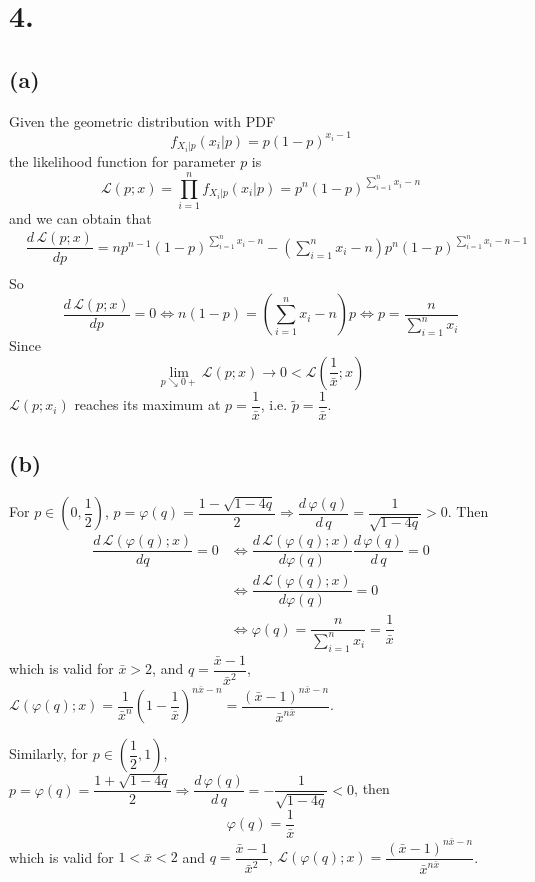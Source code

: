 \documentclass[a4paper,12pt,titlepage]{article}
\begin{document}
\section*{4.}
\subsection*{(a)}
Given the geometric distribution with PDF
$$f_{X_i|p}(x_i | p) = p(1 - p)^{x_i-1}$$
the likelihood function for parameter $p$ is
$$\mathcal{L}(p;x)=\prod\limits_{i=1}^nf_{X_i|p}(x_i | p)=p^n(1 - p)^{\sum\limits_{i=1}^nx_i-n}$$
and we can obtain that
\begin{align*}
    &\dfrac{d\, \mathcal{L}(p;x)}{dp}=np^{n-1}(1-p)^{\sum\limits_{i=1}^nx_i-n}-(\sum\limits_{i=1}^nx_i-n)p^n(1-p)^{\sum\limits_{i=1}^nx_i-n-1}\\
\end{align*}
So
$$\dfrac{d\, \mathcal{L}(p;x)}{dp}=0\Leftrightarrow n(1-p)=(\sum\limits_{i=1}^nx_i-n)p\Leftrightarrow p=\dfrac{n}{\sum\limits_{i=1}^nx_i}$$
Since 
$$\lim_{p\searrow0+}\mathcal{L}(p;x)\rightarrow0<\mathcal{L}(\dfrac{1}{\bar{x}};x)$$
$\mathcal{L}(p;x_i)$ reaches its maximum at $p=\dfrac{1}{\bar{x}}$, i.e. $\widetilde{p}=\dfrac{1}{\bar{x}}$.

\subsection*{(b)}
For $p\in(0,\dfrac{1}{2})$, $p=\varphi(q)=\dfrac{1-\sqrt{1-4q}}{2}\Rightarrow \dfrac{d\,\varphi(q)}{d\,q}=\dfrac{1}{\sqrt{1-4q}}>0$.
Then
\begin{align*}
    \dfrac{d\, \mathcal{L}(\varphi(q);x)}{dq}=0&\Leftrightarrow \dfrac{d\, \mathcal{L}(\varphi(q);x)}{d\varphi(q)}\dfrac{d\,\varphi(q)}{d\,q}=0 \\
    &\Leftrightarrow \dfrac{d\, \mathcal{L}(\varphi(q);x)}{d\varphi(q)}=0\\
    &\Leftrightarrow \varphi(q)=\dfrac{n}{\sum\limits_{i=1}^nx_i}=\dfrac{1}{\bar{x}}
\end{align*}
which is valid for $\bar{x}>2$, and $q=\dfrac{\bar{x}-1}{\bar{x}^2}$, $\mathcal{L}(\varphi(q);x)=\dfrac{1}{\bar{x}^n}(1-\dfrac{1}{\bar{x}})^{n\bar{x}-n}=\dfrac{(\bar{x}-1)^{n\bar{x}-n}}{\bar{x}^{n\bar{x}}}$.

Similarly, for $p\in(\dfrac{1}{2}, 1)$, $p=\varphi(q)=\dfrac{1+\sqrt{1-4q}}{2}\Rightarrow \dfrac{d\,\varphi(q)}{d\,q}=-\dfrac{1}{\sqrt{1-4q}}<0$, then
$$\varphi(q)=\dfrac{1}{\bar{x}}$$
which is valid for $1<\bar{x}<2$  and $q=\dfrac{\bar{x}-1}{\bar{x}^2}$, $\mathcal{L}(\varphi(q);x)=\dfrac{(\bar{x}-1)^{n\bar{x}-n}}{\bar{x}^{n\bar{x}}}$.
\end{document}
